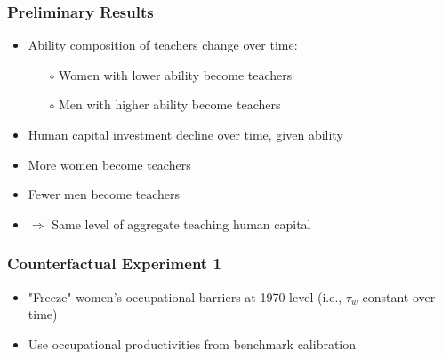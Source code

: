 \documentclass[11pt]{beamer}
\begin{document}
\begin{frame}
\frametitle{Preliminary Results}
\label{res}
\begin{itemize}
    \item Ability composition of teachers change over time:
    \begin{itemize}
				\item[$\circ$] Women with lower ability become teachers \hyperlink{femaleabil}{} %
                \item[$\circ$] Men with higher ability become teachers\\ \hyperlink{maleabil}{} %
    \end{itemize}
    \item Human capital investment decline over time, given ability \hyperlink{invest}{} %
    \item More women become teachers
    \item Fewer men become teachers
    \item $\Rightarrow$ Same level of aggregate teaching human capital \hyperlink{humcap}{}
\end{itemize}
\end{frame}

\begin{frame}
\frametitle{Counterfactual Experiment 1}
\begin{itemize}
  \item "Freeze" women's occupational barriers at 1970 level (i.e., $\tau_w$ constant over time)
  \item Use occupational productivities from benchmark calibration
\end{itemize}
\end{frame}
\end{document}
